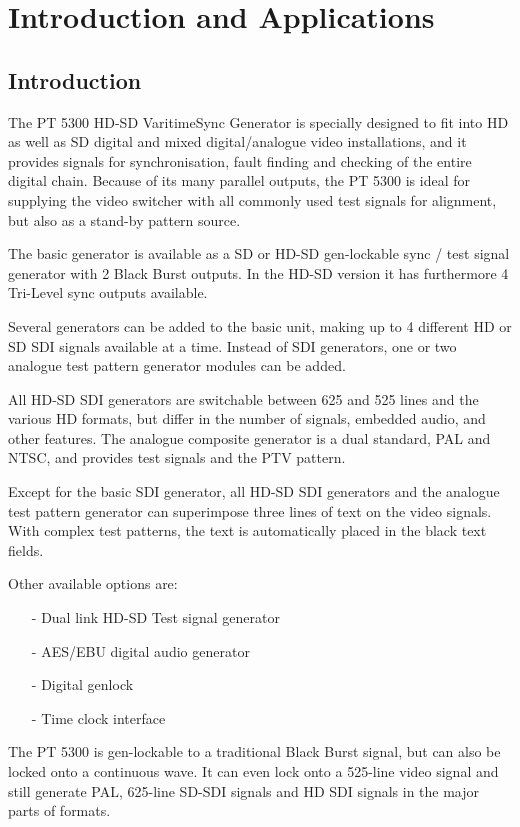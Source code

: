 \section{Introduction and Applications}
\label{cha:Introduction and Applications}
\subsection{Introduction}
The PT 5300 HD-SD Varitime\TM Sync Generator is specially designed to fit into HD as well as SD digital and mixed digital/analogue video installations, and it provides signals for synchronisation, fault finding and checking of the entire digital chain. Because of its many parallel outputs, the PT 5300 is ideal for supplying the video switcher with all commonly used test signals for alignment, but also as a stand-by pattern source.

The basic generator is available as a SD or HD-SD gen-lockable sync / test signal generator with 2 Black Burst outputs. In the HD-SD version it has furthermore 4 Tri-Level sync outputs available. 

Several generators can be added to the basic unit, making up to 4 different HD or SD SDI signals available at a time. Instead of SDI generators, one or two analogue test pattern generator modules can be added.

All HD-SD SDI generators are switchable between 625 and 525 lines and the various HD formats, but differ in the number of signals, embedded audio, and other features. The analogue composite generator is a dual standard, PAL and NTSC, and provides test signals and the PTV pattern.

Except for the basic SDI generator, all HD-SD SDI generators and the analogue test pattern generator can superimpose three lines of text on the video signals. With complex test patterns, the text is automatically placed in the black text fields.

Other available options are:
\begin{itemize}
	\item[-] Dual link HD-SD Test signal generator
	\item[-] AES/EBU digital audio generator
	\item[-] Digital genlock
	\item[-] Time clock interface
\end{itemize}

The PT 5300 is gen-lockable to a traditional Black Burst signal, but can also be locked onto a continuous wave. It can even lock onto a 525-line video signal and still generate PAL, 625-line SD-SDI signals and HD SDI signals in the major parts of formats.


